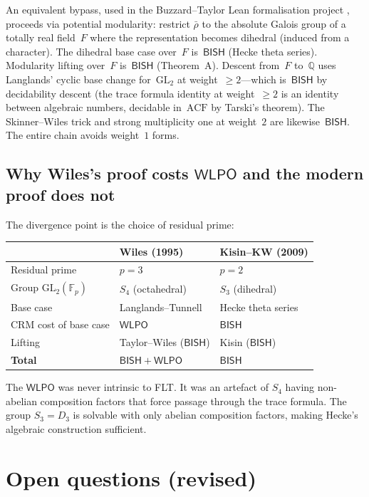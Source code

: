 \documentclass[11pt]{article}
\theoremstyle{plain}
\theoremstyle{definition}
\theoremstyle{remark}
\newcommand{\Q}{\mathbb{Q}}
\newcommand{\F}{\mathbb{F}}
\newcommand{\GL}{\mathrm{GL}}
\newcommand{\BISH}{\mathsf{BISH}}
\newcommand{\WLPO}{\mathsf{WLPO}}
\begin{document}
An equivalent bypass, used in the Buzzard--Taylor Lean
formalisation project \cite{BuzzardTaylorFLT}, proceeds via
potential modularity: restrict $\bar{\rho}$ to the absolute
Galois group of a totally real field~$F$ where the representation
becomes dihedral (induced from a character).  The dihedral
base case over~$F$ is~$\BISH$ (Hecke theta series).  Modularity
lifting over~$F$ is~$\BISH$ (Theorem~A).  Descent from~$F$
to~$\Q$ uses Langlands' cyclic base change for~$\GL_2$ at
weight~$\ge 2$---which is~$\BISH$ by decidability descent
(the trace formula identity at weight~$\ge 2$ is an identity
between algebraic numbers, decidable in~$\mathrm{ACF}$ by Tarski's
theorem).  The Skinner--Wiles trick and strong multiplicity one
at weight~$2$ are likewise~$\BISH$.  The entire chain avoids
weight~$1$ forms.

\subsection{Why Wiles's proof costs $\WLPO$ and the modern
  proof does not}

The divergence point is the choice of residual prime:

\begin{center}
\begin{tabular}{lll}
\toprule
 & Wiles (1995) & Kisin--KW (2009) \\
\midrule
Residual prime & $p = 3$ & $p = 2$ \\
Group $\GL_2(\F_p)$ & $S_4$ (octahedral) & $S_3$ (dihedral) \\
Base case & Langlands--Tunnell & Hecke theta series \\
CRM cost of base case & $\WLPO$ & $\BISH$ \\
Lifting & Taylor--Wiles ($\BISH$) & Kisin ($\BISH$) \\
\midrule
\textbf{Total} & $\BISH + \WLPO$ & $\BISH$ \\
\bottomrule
\end{tabular}
\end{center}

The $\WLPO$ was never intrinsic to FLT.  It was an artefact
of $S_4$ having non-abelian composition factors that force
passage through the trace formula.  The group $S_3 = D_3$ is
solvable with only abelian composition factors, making Hecke's
algebraic construction sufficient.


\section{Open questions (revised)}\label{sec:open-revised}
\end{document}
